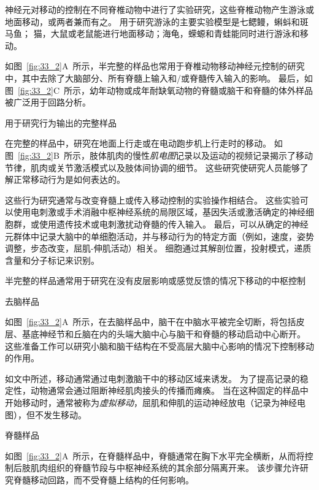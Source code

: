 \begin{proposition}[用于研究移动神经元控制的样品] \label{box:33_1}
	
	\quad \quad 神经元对移动的控制在不同脊椎动物中进行了实验研究，这些脊椎动物产生游泳或地面移动，或两者兼而有之。
	用于研究游泳的主要实验模型是七鳃鳗，蝌蚪和斑马鱼；
	猫，大鼠或老鼠能进行地面移动；海龟，蝾螈和青蛙能同时进行游泳和移动。
	
	\quad \quad 如图~\ref{fig:33_2}A~所示，半完整的样品也常用于脊椎动物移动神经元控制的研究中，其中去除了大脑部分、所有脊髓上输入和/或脊髓传入输入的影响。
	最后，如图~\ref{fig:33_2}C~所示，幼年动物或成年耐缺氧动物的脊髓或脑干和脊髓的体外样品被广泛用于回路分析。
	
	\quad \quad 用于研究行为输出的完整样品
	
	\quad \quad 在完整的样品中，研究在地面上行走或在电动跑步机上行走时的移动。
	如图~\ref{fig:33_2}B~所示，肢体肌肉的慢性\textit{肌电图}记录以及运动的视频记录揭示了移动节律，肌肉或关节激活模式以及肢体间协调的细节。
	这些研究使研究人员能够了解正常移动行为是如何表达的。
	
	\quad \quad 这些行为研究通常与改变脊髓上或传入移动控制的实验操作相结合。
	这些实验可以使用电刺激或手术消融中枢神经系统的局限区域，基因失活或激活确定的神经细胞群，或使用遗传技术或电刺激扰动脊髓的传入输入。
	最后，可以从确定的神经元群体中记录大脑中的单细胞活动，并与移动行为的特定方面（例如，速度，姿势调整，步态改变，屈肌-伸肌活动）相关。
	细胞通过其解剖位置，投射模式，递质含量和分子标记来识别。
	
	\quad \quad 半完整的样品通常用于研究在没有皮层影响或感觉反馈的情况下移动的中枢控制
	
	\quad \quad 去脑样品
	
	\quad \quad 如图~\ref{fig:33_2}A~所示，在去脑样品中，脑干在中脑水平被完全切断，将包括皮层、基底神经节和丘脑在内的头端大脑中心与脑干和脊髓的移动启动中心断开。
	这些准备工作可以研究小脑和脑干结构在不受高层大脑中心影响的情况下控制移动的作用。
	
	\quad \quad 如文中所述，移动通常通过电刺激脑干中的移动区域来诱发。
	为了提高记录的稳定性，动物通常会通过阻断神经肌肉接头的传播而瘫痪。
	当在这种固定的样品中开始移动时，通常被称为\textit{虚拟移动}，屈肌和伸肌的运动神经放电（记录为神经电图），但不发生移动。
	
	\quad \quad 脊髓样品
	
	\quad \quad 如图~\ref{fig:33_2}A~所示，在脊髓样品中，脊髓通常在胸下水平完全横断，从而将控制后肢肌肉组织的脊髓节段与中枢神经系统的其余部分隔离开来。
	该步骤允许研究脊髓移动回路，而不受脊髓上结构的任何影响。
	

\end{proposition}
